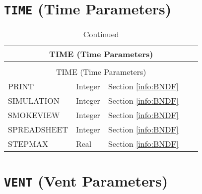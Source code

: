 \vspace{\baselineskip}


\section{\texorpdfstring{{\tt TIME}}{TIME} (Time Parameters)}

\begin{longtable}{@{\extracolsep{\fill}}|l|l|l|l|l|}
\caption[Boundary file parameters ({\ct TIME} namelist group)]{For more information see Section~\ref{info:BNDF}.}
\label{tbl:TIME} \\
\hline
\multicolumn{5}{|c|}{{\ct TIME} (Time Parameters)} \\
\hline \hline
\endfirsthead
\caption[]{Continued} \\
\hline
\multicolumn{5}{|c|}{{\ct TIME} (Time Parameters)} \\
\hline \hline
\endhead
{\ct PRINT}        & Integer   & Section \ref{info:BNDF}                 &           &                 \\ \hline
{\ct SIMULATION}        & Integer   & Section \ref{info:BNDF}                 &           &                 \\ \hline
{\ct SMOKEVIEW}        & Integer   & Section \ref{info:BNDF}                 &           &                 \\ \hline
{\ct SPREADSHEET}        & Integer   & Section \ref{info:BNDF}                 &           &                 \\ \hline
{\ct STEPMAX}        & Real   & Section \ref{info:BNDF}                 &           &                 \\ \hline
\end{longtable}

\vspace{\baselineskip}



\section{\texorpdfstring{{\tt VENT}}{VENT} (Vent Parameters)}

